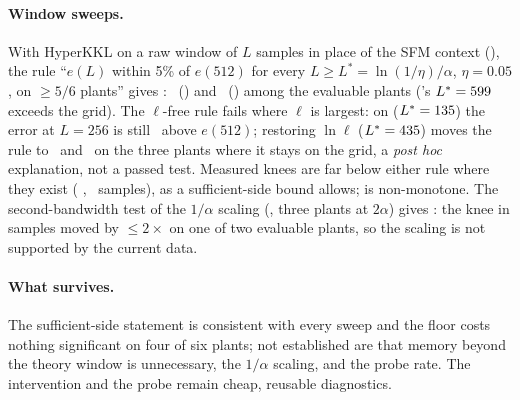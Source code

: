 \paragraph{Window sweeps.} With HyperKKL on a raw window of $L$ samples in place of the SFM context (), the rule ``$e(L)$ within 5\% of $e(512)$ for every $L\ge L^*=\ln(1/\eta)/\alpha$, $\eta=0.05$, on $\ge5/6$ plants'' gives \OutcomeCTwoWindowAOne: \CtwoWindowTheoryId\ () and \CtwoWindowTheorySeq\ () among the evaluable plants ('s $L^*=599$ exceeds the grid). The $\ell$-free rule fails where $\ell$ is largest: on  ($L^*=135$) the error at $L=256$ is still \CtwoWindowTwoFiveSixVsMaxBatterySeq\ above $e(512)$; restoring $\ln\ell$ ($L^*=435$) moves the rule to \CtwoWindowRefinedId\ and \CtwoWindowRefinedSeq\ on the three plants where it stays on the grid, a \emph{post hoc} explanation, not a passed test. Measured knees are far below either rule where they exist ( \CtwoKneeVdpSeq,  \CtwoKneeDuffingSeq\ samples), as a sufficient-side bound allows;  is non-monotone. The second-bandwidth test of the $1/\alpha$ scaling (, three plants at $2\alpha$) gives \OutcomeCTwoWindowATwo: the knee in samples moved by $\le2\times$ on one of two evaluable plants, so the scaling is not supported by the current data.

\paragraph{What survives.} The sufficient-side statement is consistent with every sweep and the floor costs nothing significant on four of six plants; not established are that memory beyond the theory window is unnecessary, the $1/\alpha$ scaling, and the probe rate. The intervention and the probe remain cheap, reusable diagnostics.
